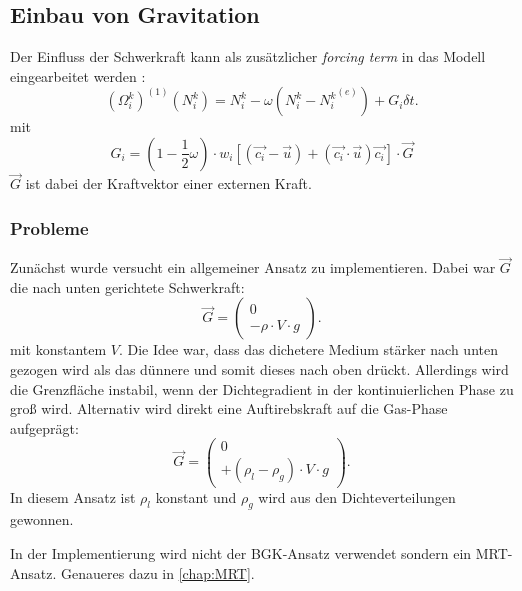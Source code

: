 \documentclass[a4paper,10pt]{scrreprt}
\begin{document}
\subsection{Einbau von Gravitation}
Der Einfluss der Schwerkraft kann als zusätzlicher \emph{forcing term} in das Modell eingearbeitet werden \cite{Guo2002}: 
\begin{equation}
 (\Omega_i^k)^{(1)} (N_i^k) = N_i^k - \omega \left(N_i^k - {N_i^k}^{(e)} \right) + G_i \delta t.
\end{equation}
mit 
\begin{equation}
 G_i = \left( 1 - \frac{1}{2} \omega  \right) \cdot w_i \left[ (\vec{c_i} - \vec{u})  + (\vec{c_i} \cdot \vec{u}) \vec{c_i}   \right] \cdot \vec{G}
\end{equation}
$\vec{G}$ ist dabei der Kraftvektor einer externen Kraft. 
\subsubsection{Probleme}
Zunächst wurde versucht ein allgemeiner Ansatz zu implementieren. Dabei war $\vec{G}$ die nach unten gerichtete Schwerkraft:
\begin{equation}
 \vec{G} = \left( \begin{array}{c} 
                   0 \\
		  - \rho \cdot V \cdot g
                  \end{array} \right) .
\end{equation}
mit konstantem $V$. 
Die Idee war, dass das dichetere Medium stärker nach unten gezogen wird als das dünnere und somit dieses nach oben drückt. 
Allerdings wird die Grenzfläche instabil, wenn der Dichtegradient in der kontinuierlichen Phase zu groß wird. 
Alternativ wird direkt eine Auftirebskraft auf die Gas-Phase aufgeprägt:
\begin{equation}
 \vec{G} = \left( \begin{array}{c} 
                   0 \\
		  + (\rho_l - \rho_g) \cdot V \cdot g
                  \end{array} \right) .
\end{equation}
In diesem Ansatz ist $\rho_l$ konstant und $\rho_g$ wird aus den Dichteverteilungen gewonnen.


In der Implementierung wird nicht der BGK-Ansatz verwendet sondern ein MRT-Ansatz. Genaueres dazu in \autoref{chap:MRT}.
\end{document}
